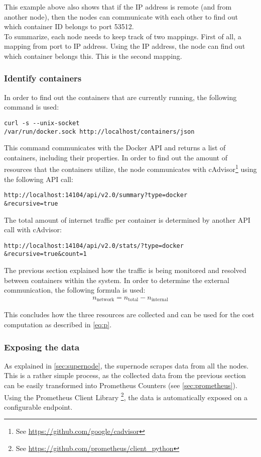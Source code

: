 \noindent
This example above also shows that if the IP address is remote (and from another node), then the nodes can communicate with each other to find out which container ID belongs to port 53512.\\

\noindent
To summarize, each node needs to keep track of two mappings. First of all, a mapping from port to IP address. Using the IP address, the node can find out which container belongs this. This is the second mapping.

\subsubsection{Identify containers}
In order to find out the containers that are currently running, the following command is used:
\begin{verbatim}
curl -s --unix-socket 
/var/run/docker.sock http://localhost/containers/json
\end{verbatim}

\noindent
This command communicates with the Docker API and returns a list of containers, including their properties. In order to find out the amount of resources that the containers utilize, the node communicates with cAdvisor\footnote{See \url{https://github.com/google/cadvisor}} using the following API call:
\begin{verbatim}
http://localhost:14104/api/v2.0/summary?type=docker
&recursive=true
\end{verbatim}

\noindent
The total amount of internet traffic per container is determined by another API call with cAdvisor:
\begin{verbatim}
http://localhost:14104/api/v2.0/stats/?type=docker
&recursive=true&count=1
\end{verbatim}

\noindent
The previous section explained how the traffic is being monitored and resolved between containers within the system. In order to determine the external communication, the following formula is used:
\begin{align} \label{formula:traffic}
n_\text{network} = n_\text{total} - n_\text{internal}
\end{align}

\noindent
This concludes how the three resources are collected and can be used for the cost computation as described in \autoref{eq:p}.

\subsubsection{Exposing the data} \label{sec:exposing_data}
As explained in \autoref{sec:supernode}, the supernode scrapes data from all the nodes. This is a rather simple process, as the collected data from the previous section can be easily transformed into Prometheus Counters (see \autoref{sec:prometheus}). Using the Prometheus Client Library \footnote{See \url{https://github.com/prometheus/client_python}}, the data is automatically exposed on a configurable endpoint.\\

